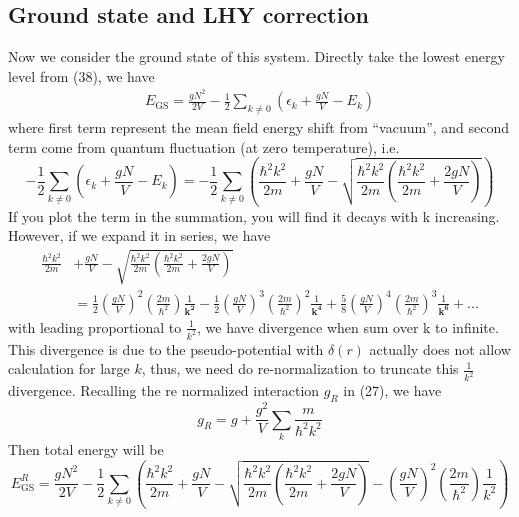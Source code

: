 \subsection{Ground state and LHY correction}
Now we consider the ground state of this system. Directly take the lowest energy level from (38), we have
\begin{equation}
\begin{split}
E_{\text{GS}}=\frac{g N^2}{2V}-\frac{1}{2}\sum _{k\neq 0} \left(\epsilon _k+\frac{g N}{V}-E_k\right)
\end{split}
\end{equation}
where first term represent the mean field energy shift from {``}vacuum{''}, and second term come from quantum fluctuation (at zero temperature), i.e.
\begin{equation}
-\frac{1}{2}\sum _{k\neq 0} \left(\epsilon _k+\frac{g N}{V}-E_k\right)=-\frac{1}{2}\sum _{k\neq 0} \left(\frac{\hbar ^2k^2}{2m}+\frac{g N}{V}-\sqrt{\frac{\hbar
^2k^2}{2m}\left(\frac{\hbar ^2k^2}{2m}+\frac{2 g N}{V}\right)}\right)
\end{equation}
If you plot the term in the summation, you will find it decays with k increasing. However, if we expand it in series, we have 
\begin{equation}
\begin{split}
\frac{\hbar ^2k^2}{2m}&+\frac{g N}{V}-\sqrt{\frac{\hbar ^2k^2}{2m}\left(\frac{\hbar ^2k^2}{2m}+\frac{2 g N}{V}\right)}\\
&=\frac{1}{2}\left(\frac{gN}{V}\right)^2\left(\frac{2m}{\hbar^2}\right)\frac{1}{\pmb{k^2}}-\frac{1}{2}\left(\frac{gN}{V}\right)^3\left(\frac{2m}{\hbar^2}\right)^2\frac{1}{\pmb{k^4}}+\frac{5}{8}\left(\frac{gN}{V}\right)^4\left(\frac{2m}{\hbar^2}\right)^3\frac{1}{\pmb{k^6}}+\text{...}
\end{split}
\end{equation}
with leading proportional to $\frac{1}{k^2}$, we have divergence when sum over k to infinite. This divergence is due to the pseudo-potential with $\delta (r)$ actually does not allow calculation for large $k$, thus, we need do re-normalization to truncate this $\frac{1}{k^2}$ divergence.
Recalling the re normalized interaction $g_R$ in (27), we have
\begin{equation}
g_R=g+\frac{g^2}{V}\sum _k \frac{m}{\hbar ^2k^2}
\end{equation}
Then total energy will be
\begin{equation}
E_{\text{GS}}^R=\frac{gN^2}{2V}-\frac{1}{2}\sum_{k\neq0}\left(\frac{\hbar ^2k^2}{2m}+\frac{gN}{V}-\sqrt{\frac{\hbar^2k^2}{2m}\left(\frac{\hbar^2k^2}{2m}+\frac{2gN}{V}\right)}-\left(\frac{gN}{V}\right)^2\left(\frac{2m}{\hbar ^2}\right)\frac{1}{k^2}\right)
\end{equation}
